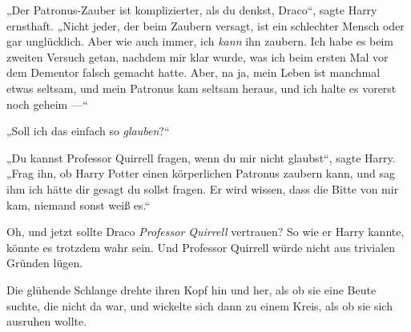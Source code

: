„Der Patronus-Zauber ist komplizierter, als du denkst, Draco“, sagte Harry ernsthaft.
„Nicht jeder, der beim Zaubern versagt, ist ein schlechter Mensch oder gar unglücklich. Aber wie auch immer, ich \emph{kann} ihn zaubern. Ich habe es beim zweiten Versuch getan, nachdem mir klar wurde, was ich beim ersten Mal vor dem Dementor falsch gemacht hatte. Aber, na ja, mein Leben ist manchmal etwas seltsam, und mein Patronus kam seltsam heraus, und ich halte es vorerst noch geheim —“

„Soll ich das einfach so \emph{glauben}?“

„Du kannst Professor Quirrell fragen, wenn du mir nicht glaubst“, sagte Harry.
„Frag ihn, ob Harry Potter einen körperlichen Patronus zaubern kann, und sag ihm ich hätte dir gesagt du sollst fragen. Er wird wissen, dass die Bitte von mir kam, niemand sonst weiß es.“

Oh, und jetzt sollte Draco \emph{Professor Quirrell} vertrauen? So wie er Harry kannte, könnte es trotzdem wahr sein. Und Professor Quirrell würde nicht aus trivialen Gründen lügen.

Die glühende Schlange drehte ihren Kopf hin und her, als ob sie eine Beute suchte, die nicht da war, und wickelte sich dann zu einem Kreis, als ob sie sich ausruhen wollte.

